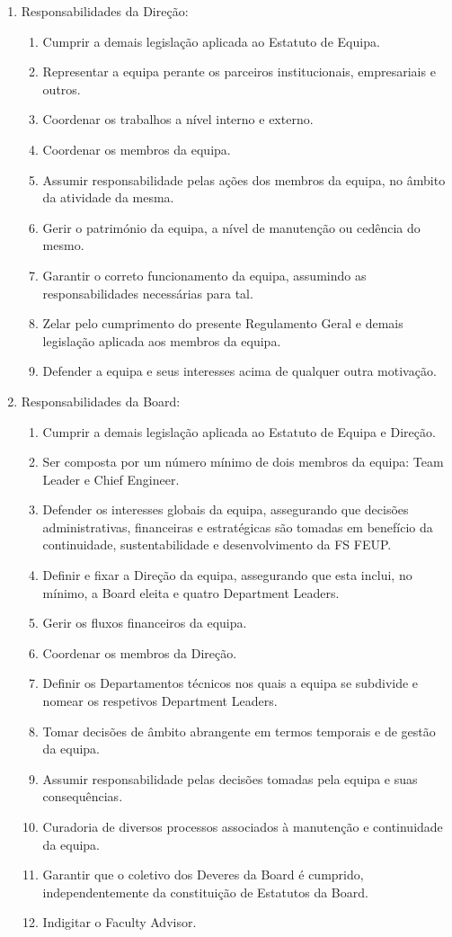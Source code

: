 \begin{enumerate}
\begin{enumerate}
  \end{enumerate}
  \item Responsabilidades da Direção:
  \begin{enumerate}
    \item Cumprir a demais legislação aplicada ao Estatuto de Equipa.
    \item Representar a equipa perante os parceiros institucionais, empresariais e outros.
    \item Coordenar os trabalhos a nível interno e externo.
    \item Coordenar os membros da equipa.
    \item Assumir responsabilidade pelas ações dos membros da equipa, no âmbito da atividade da mesma.
    \item Gerir o património da equipa, a nível de manutenção ou cedência do mesmo.
    \item Garantir o correto funcionamento da equipa, assumindo as responsabilidades necessárias para tal.
    \item Zelar pelo cumprimento do presente Regulamento Geral e demais legislação aplicada aos membros da equipa.
    \item Defender a equipa e seus interesses acima de qualquer outra motivação.
  \end{enumerate}
  \item Responsabilidades da Board:
  \begin{enumerate}
    \item Cumprir a demais legislação aplicada ao Estatuto de Equipa e Direção.
    \item Ser composta por um número mínimo de dois membros da equipa: Team Leader e Chief Engineer.
    \item Defender os interesses globais da equipa, assegurando que decisões administrativas, financeiras e estratégicas são tomadas em benefício da continuidade, sustentabilidade e desenvolvimento da FS FEUP.
    \item Definir e fixar a Direção da equipa, assegurando que esta inclui, no mínimo, a Board eleita e quatro Department Leaders.
    \item Gerir os fluxos financeiros da equipa.
    \item Coordenar os membros da Direção.
    \item Definir os Departamentos técnicos nos quais a equipa se subdivide e nomear os respetivos Department Leaders.
    \item Tomar decisões de âmbito abrangente em termos temporais e de gestão da equipa.
    \item Assumir responsabilidade pelas decisões tomadas pela equipa e suas consequências.
    \item Curadoria de diversos processos associados à manutenção e continuidade da equipa.
    \item Garantir que o coletivo dos Deveres da Board é cumprido, independentemente da constituição de Estatutos da Board.
    \item Indigitar o Faculty Advisor.
  \end{enumerate}
\end{enumerate}
